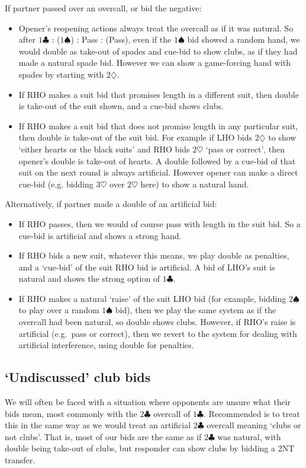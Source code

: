 \documentclass{article}
\newcommand{\sz}{\spadesuit}
\newcommand{\hz}{\heartsuit}
\newcommand{\dz}{\diamondsuit}
\newcommand{\cz}{\clubsuit}
\begin{document}
If partner passed over an overcall, or bid the negative:
\begin{itemize}
\item Opener's reopening actions always treat the overcall as if it was natural. So after $1\cz$ : ($1\sz$) : Pass : (Pass), even if the $1\sz$ bid showed a random hand, we would double as take-out of spades and cue-bid to show clubs, as if they had made a natural spade bid. However we can show a game-forcing hand with spades by starting with $2\dz$.
\item If RHO makes a suit bid that promises length in a different suit, then double is take-out of the suit shown, and a cue-bid shows clubs.
\item If RHO makes a suit bid that does not promise length in any particular suit, then double is take-out of the suit bid. For example if LHO bids $2\dz$ to show `either hearts or the black suits' and RHO bids $2\hz$ `pass or correct', then opener's double is take-out of hearts. A double followed by a cue-bid of that suit on the next round is always artificial. However opener can make a direct cue-bid (e.g. bidding $3\hz$ over $2\hz$ here) to show a natural hand.
\end{itemize}
Alternatively, if partner made a double of an artificial bid:
\begin{itemize}
\item If RHO passes, then we would of course pass with length in the suit bid. So a cue-bid is artificial and shows a strong hand.
\item If RHO bids a new suit, whatever this means, we play double as penalties, and a `cue-bid' of the suit RHO bid is artificial. A bid of LHO's suit is natural and shows the strong option of $1\cz$.
\item If RHO makes a natural `raise' of the suit LHO bid (for example, bidding $2\sz$ to play over a random $1\sz$ bid), then we play the same system as if the overcall had been natural, so double shows clubs. However, if RHO's raise is artificial (e.g.~pass or correct), then we revert to the system for dealing with artificial interference, using double for penalties.
\end{itemize}

\subsection{`Undiscussed' club bids}

We will often be faced with a situation where opponents are unsure what their bids mean, most commonly with the $2\cz$ overcall of $1\cz$. Recommended is to treat this in the same way as we would treat an artificial $2\cz$ overcall meaning `clubs or not clubs'. That is, most of our bids are the same as if $2\cz$ was natural, with double being take-out of clubs, but responder can show clubs by bidding a 2NT transfer.
\end{document}
